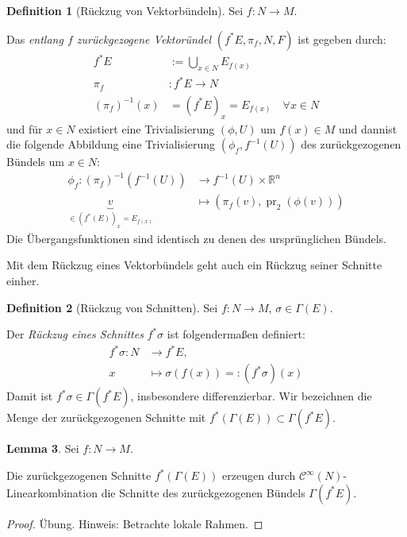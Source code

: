 \documentclass[a4paper]{scrreprt}
\numberwithin{equation}{chapter}
\DeclareMathOperator{\pr}{pr}
\newcommand{\R}{\mathbb{R}}
\newcommand{\sC}{\mathcal{C}^{\infty}}
\theoremstyle{definition}
\newtheorem{defn}{Definition}[section]
\newtheorem{lemma}[defn]{Lemma}
\begin{document}
		\begin{defn}[Rückzug von Vektorbündeln]
			Sei $f\colon N\rightarrow M$.
			
			Das \emph{entlang $f$ zurückgezogene Vektoründel} $(f^*E,\pi_f,N, F)$ ist gegeben durch:
			\begin{align*}
				f^*E&:=\bigcup _{x\in N} E_{f(x)}\\
				\pi_f&\colon f^*E\rightarrow N\\
				(\pi_f)^{-1}(x)&=(f^*E)_x=E_{f(x)}\quad\forall x\in N
			\end{align*}
			und für $x\in N$ existiert eine Trivialisierung $(\phi,U)$ um $f(x)\in M$ und dannist die folgende Abbildung eine Trivialisierung $(\phi_f,f^{-1}(U))$ des zurückgezogenen Bündels um $x\in N$:
			\begin{align*}
				\phi_f \colon (\pi_f)^{-1}(f^{-1}(U))&\rightarrow f^{-1}(U)\times\R^n\\
				\underbrace{v}_{\in (f^*(E))_x=E_{f(x)}}&\mapsto (\pi_f(v),\pr_2(\phi(v)))
			\end{align*}
			Die Übergangsfunktionen sind identisch zu denen des ursprünglichen Bündels.
		\end{defn}
		Mit dem Rückzug eines Vektorbündels geht auch ein Rückzug seiner Schnitte einher.
		\begin{defn}[Rückzug von Schnitten]
			Sei $f:N\rightarrow M$, $\sigma\in\Gamma(E)$.
			
			Der \emph{Rückzug eines Schnittes} $f^*\sigma$ ist folgendermaßen definiert:
			\begin{align*}
				f^*\sigma\colon N &\rightarrow f^*E,\\
				x &\mapsto \sigma(f(x))=: (f^*\sigma)(x)
			\end{align*}
			Damit ist $f^*\sigma\in\Gamma(f^*E)$, insbesondere differenzierbar. Wir bezeichnen die Menge der zurückgezogenen Schnitte mit $f^*(\Gamma(E))\subset\Gamma(f^*E)$.
		\end{defn}
		\begin{lemma}\label{lemma:Zurückziehen_von_Schnitten}
			Sei $f:N\rightarrow M$.
			
			Die zurückgezogenen Schnitte $f^*(\Gamma(E))$ erzeugen durch $\sC(N)$-Linearkombination die Schnitte des zurückgezogenen Bündels $\Gamma(f^*E)$.
			\begin{proof}
				Übung. Hinweis: Betrachte lokale Rahmen.
			\end{proof}
		\end{lemma}


\end{document}
